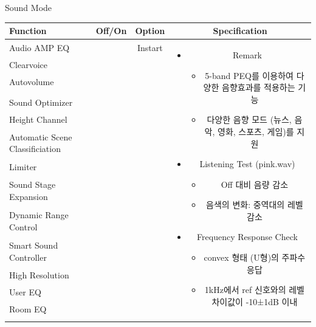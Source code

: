 \documentclass{beamer}
\begin{document}
	
	\begin{frame}[t]{Sound Mode}
		\begin{tiny}
			\begin{tabular}{@{}lccc@{}}
				\toprule
				Function & Off/On & Option & Specification \\
				\midrule
				Audio AMP EQ & \color{black}{Off} & Instart &
				\multirow{14}{60mm}{
					\begin{itemize}
						\item Remark
						\begin{itemize}
							\item 5-band PEQ를 이용하여 다양한 음향효과를 적용하는 기능
							\item 다양한 음향 모드 (뉴스, 음악, 영화, 스포츠, 게임)를 지원
						\end{itemize}
						\item Listening Test (pink.wav)
						\begin{itemize}
							\item Off 대비 음량 감소
							\item 음색의 변화: 중역대의 레벨 감소
						\end{itemize}
						\item Frequency Response Check
						\begin{itemize}
							\item convex 형태 (U형)의 주파수응답
							\item 1kHz에서 ref 신호와의 레벨 차이값이 -10±1dB 이내
						\end{itemize}
					\end{itemize}
				} \\
				Clearvoice & \color{black}{Off} & & \\
				Autovolume & \color{black}{Off} & & \\
				\color{blue}{Sound Mode} & \color{blue}{On} & & \\
				Sound Optimizer & \color{black}{Off} & & \\
				Height Channel & \color{black}{Off} & & \\
				Automatic Scene Classificiation & \color{black}{Off} & & \\
				Limiter & \color{black}{Off} & & \\
				Sound Stage Expansion & \color{black}{Off} & & \\
				Dynamic Range Control & \color{black}{Off} & & \\
				Smart Sound Controller & \color{black}{Off} & & \\
				High Resolution & \color{black}{Off} & & \\
				User EQ & \color{black}{Off} & & \\
				Room EQ & \color{black}{Off} & & \\
				\color{blue}{OSD Volume} & \color{blue}{On} &  \color{blue}{Vol.40} & \\
				\midrule
			\end{tabular}
		\end{tiny}
		

\end{frame}
\end{document}
